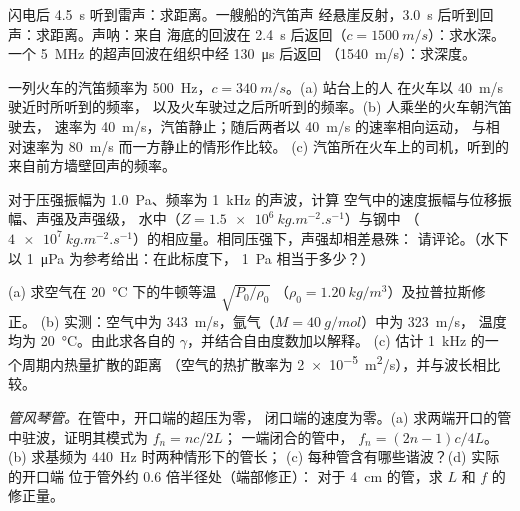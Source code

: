 \begin{exercise}[$\star$]\label{exo:b2:sound-waves:4}
闪电后 \qty{4.5}{s} 听到雷声：求距离。一艘船的汽笛声
经悬崖反射，\qty{3.0}{s} 后听到回声：求距离。声呐：来自
海底的回波在 \qty{2.4}{s} 后返回（$c = \qty{1500}{m/s}$）：求水深。一个
\qty{5}{MHz} 的超声回波在组织中经 \qty{130}{\micro s} 后返回
（\qty{1540}{m/s}）：求深度。
\end{exercise}

\begin{exercise}[$\star\star$]\label{exo:b2:sound-waves:5}
一列火车的汽笛频率为 \qty{500}{Hz}，$c = \qty{340}{m/s}$。(a) 站台上的人
在火车以 \qty{40}{m/s} 驶近时所听到的频率，
以及火车驶过之后所听到的频率。(b) 人乘坐的火车朝汽笛驶去，
速率为 \qty{40}{m/s}，汽笛静止；随后两者以 \qty{40}{m/s} 的速率相向运动，
与相对速率为 \qty{80}{m/s} 而一方静止的情形作比较。
(c) 汽笛所在火车上的司机，听到的
来自前方墙壁回声的频率。
\end{exercise}

\begin{exercise}[$\star\star$]\label{exo:b2:sound-waves:6}
对于压强振幅为 \qty{1.0}{Pa}、频率为 \qty{1}{kHz} 的声波，计算
空气中的速度振幅与位移振幅、声强及声强级，
水中（$Z = \qty{1.5e6}{kg.m^{-2}.s^{-1}}$）与钢中
（$\qty{4e7}{kg.m^{-2}.s^{-1}}$）的相应量。相同压强下，声强却相差悬殊：
请评论。（水下以 \qty{1}{\micro Pa} 为参考给出：在此标度下，
\qty{1}{Pa} 相当于多少？）
\end{exercise}

\begin{exercise}[$\star\star$]\label{exo:b2:sound-waves:7}
(a) 求空气在 \qty{20}{\degreeCelsius} 下的牛顿等温 $\sqrt{P_0/\rho_0}$
（$\rho_0 = \qty{1.20}{kg/m^3}$）及拉普拉斯修正。
(b) 实测：空气中为 \qty{343}{m/s}，氩气（$M = \qty{40}{g/mol}$）中为 \qty{323}{m/s}，
温度均为 \qty{20}{\degreeCelsius}。由此求各自的 $\gamma$，并结合自由度数加以解释。
(c) 估计 \qty{1}{kHz} 的一个周期内热量扩散的距离
（空气的热扩散率为
\qty{2e-5}{m^2/s}），并与波长相比较。
\end{exercise}

\begin{exercise}[$\star\star$]\label{exo:b2:sound-waves:8}
\emph{管风琴管。}在管中，开口端的超压为零，
闭口端的速度为零。(a) 求两端开口的管中驻波，证明其模式为 $f_n = nc/2L$；
一端闭合的管中，
$f_n = (2n - 1)c/4L$。(b) 求基频为 \qty{440}{Hz} 时两种情形下的管长；
(c) 每种管含有哪些谐波？(d) 实际的开口端
位于管外约 $0.6$ 倍半径处（端部修正）：
对于 \qty{4}{cm} 的管，求 $L$ 和 $f$ 的修正量。
\end{exercise}

